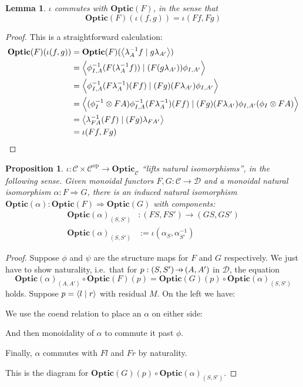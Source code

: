 \documentclass[11pt,letterpaper]{article}
\theoremstyle{plain}
\newtheorem{proposition}[theorem]{Proposition}
\newtheorem{lemma}[theorem]{Lemma}
\theoremstyle{definition}
\newcommand{\C}{\mathscr{C}}
\newcommand{\D}{\mathscr{D}}
\newcommand{\Optic}{\mathbf{Optic}}
\newcommand{\op}{\mathrm{op}}
\newcommand{\rep}[2]{{\ensuremath \left\langle #1 \mid #2 \right\rangle}}
\newcommand{\hto}{\ensuremath{\,\mathaccent\shortmid\rightarrow\,}}
\begin{document}
\begin{lemma}\label{lem:iota-commute-with-opticf}
$\iota$ commutes with $\Optic(F)$, in the sense that
\[ \Optic(F)(\iota(f, g)) = \iota(Ff, Fg) \]
\end{lemma}
\begin{proof}
This is a straightforward calculation:
  \begin{align*}
    \Optic(F)(\iota(f, g))
    &= \Optic(F)(\rep{\lambda_A^{-1} f}{g \lambda_{A'}}) \\
    &= \rep{\phi^{-1}_{I,A} (F(\lambda_A^{-1} f))}{(F(g \lambda_{A'})) \phi_{I,A'}} \\
    &= \rep{\phi^{-1}_{I,A} (F\lambda_A^{-1}) (Ff)}{(Fg)(F \lambda_{A'}) \phi_{I,A'}} \\
    &= \rep{(\phi^{-1}_I \otimes FA) \phi^{-1}_{I,A} (F\lambda_A^{-1}) (Ff)}{(Fg)(F \lambda_{A'}) \phi_{I,A'} (\phi_I \otimes FA)} \\
    &= \rep{\lambda_{FA}^{-1} (Ff)}{(Fg)\lambda_{FA'}} \\
    &= \iota(Ff, Fg)
  \end{align*}
\end{proof}

\begin{proposition}\label{prop:iota-naturality}
$\iota : \C \times \C^\op \to \Optic_\C$ ``lifts natural isomorphisms'', in the following sense. Given monoidal functors $F, G : \C \to \D$ and a monoidal natural isomorphism $\alpha : F \Rightarrow G$, there is an induced natural isomorphism $\Optic(\alpha) : \Optic(F) \Rightarrow \Optic(G)$ with components:
\begin{align*}
{\Optic(\alpha)}_{(S, S')} &: (FS, FS') \to (GS, GS') \\
{\Optic(\alpha)}_{(S, S')} &:= \iota(\alpha_{S}, \alpha^{-1}_{S'})
\end{align*}
\end{proposition}
\begin{proof}
Suppose $\phi$ and $\psi$ are the structure maps for $F$ and $G$ respectively. We just have to show naturality, i.e.\ that for $p : (S, S') \hto (A, A')$ in $\D$, the equation \[\Optic(\alpha)_{(A, A')} \circ \Optic(F)(p) = \Optic(G)(p) \circ \Optic(\alpha)_{(S, S')}\] holds. Suppose $p = \rep{l}{r}$ with residual $M$. On the left we have:
  \begin{center}
    
  \end{center}
  We use the coend relation to place an $\alpha$ on either side:
  \begin{center}
    
  \end{center}
  And then monoidality of $\alpha$ to commute it past $\phi$.
  \begin{center}
    
  \end{center}
  Finally, $\alpha$ commutes with $F l$ and $F r$ by naturality.
  \begin{center}
    
  \end{center}
  This is the diagram for $\Optic(G)(p) \circ {\Optic(\alpha)}_{(S, S')}$.
\end{proof}
\end{document}
